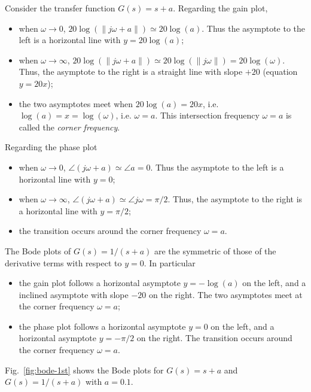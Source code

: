\documentclass[a4paper,11pt]{report}
\theoremstyle{definition}
\begin{document}
Consider the transfer function $G(s)=s+a$. Regarding the gain plot,
\begin{itemize}
\item when $\omega\to 0$, $20\log(\|j\omega+a\|)\simeq
  20\log(a)$. Thus the asymptote to the left is a horizontal line
  with $y=20\log(a)$;
\item when $\omega\to\infty$, $20\log(\|j\omega+a\|)\simeq
  20\log(\|j\omega\|)=20\log(\omega)$. Thus, the asymptote to the
  right is a straight line with slope $+20$ (equation $y=20x$);
\item the two asymptotes meet when $20\log(a)=20x$,
  i.e. $\log(a)=x=\log(\omega)$, i.e. $\omega=a$. This intersection
  frequency $\omega=a$ is called the \emph{corner frequency}.
\end{itemize}

Regarding the phase plot
\begin{itemize}
\item when $\omega\to 0$, $\angle(j\omega+a) \simeq \angle a =
  0$. Thus the asymptote to the left is a horizontal line with $y=0$;
\item when $\omega\to\infty$, $\angle(j\omega+a) \simeq \angle j\omega
  = \pi/2$. Thus, the asymptote to the right is a horizontal line with
  $y=\pi/2$;
\item the transition occurs around the corner frequency $\omega=a$.
\end{itemize}

The Bode plots of $G(s)=1/(s+a)$ are the symmetric of those of the
derivative terms with respect to $y=0$. In particular
\begin{itemize}
\item the gain plot follows a horizontal asymptote $y=-\log(a)$ on the
  left, and a inclined asymptote with slope $-20$ on the right. The
  two asymptotes meet at the corner frequency $\omega=a$;
\item the phase plot follows a horizontal asymptote $y=0$ on the left,
  and a horizontal asymptote $y=-\pi/2$ on the right. The transition
  occurs around the corner frequency $\omega=a$.
\end{itemize}

Fig.~\ref{fig:bode-1st} shows the Bode plots for $G(s) = s+a$ and
$G(s)=1/(s+a)$ with $a=0.1$.
\end{document}
